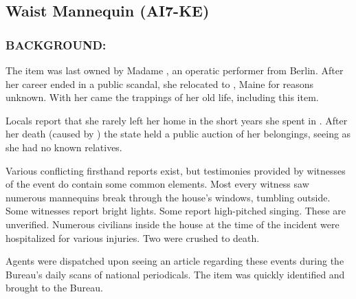 \subsection*{Waist Mannequin (AI7-KE)}
\subsubsection*{BACKGROUND:}
\par The item was last owned by Madame , an operatic
performer from Berlin. After her career ended in a public scandal,
she relocated to , Maine for reasons unknown. With
her came the trappings of her old life, including this item.
\par Locals report that she rarely left her home in the short years she
spent in . After her death (caused by  )
the state held a public auction of her belongings,
seeing as she had no known relatives.
\par Various conflicting firsthand reports exist, but testimonies
provided by witnesses of the event do contain some common
elements. Most every witness saw numerous mannequins break
through the house's windows, tumbling outside. Some witnesses
report bright lights. Some report high-pitched singing. These are
unverified. Numerous civilians inside the house at the time of the
incident were hospitalized for various injuries. Two were crushed
to death.
\par Agents were dispatched upon seeing an article regarding these
events during the Bureau's daily scans of national periodicals. The
item was quickly identified and brought to the Bureau.
